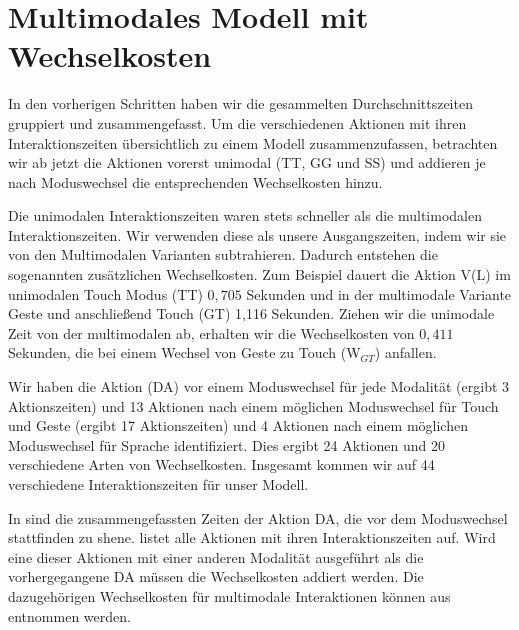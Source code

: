 \section[Multimodales Modell]{Multimodales Modell mit Wechselkosten}
In den vorherigen Schritten haben wir die gesammelten Durchschnittszeiten gruppiert und zusammengefasst.
Um die verschiedenen Aktionen mit ihren Interaktionszeiten übersichtlich zu einem Modell zusammenzufassen, betrachten wir ab jetzt die Aktionen vorerst unimodal (TT, GG und SS) und addieren je nach Moduswechsel die entsprechenden Wechselkosten hinzu.

Die unimodalen Interaktionszeiten waren stets schneller als die multimodalen Interaktionszeiten.
Wir verwenden diese als unsere Ausgangszeiten, indem wir sie von den Multimodalen Varianten subtrahieren.
Dadurch entstehen die sogenannten zusätzlichen Wechselkosten.
Zum Beispiel dauert die Aktion V(L) im unimodalen Touch Modus (TT) $0,705$ Sekunden und in der multimodale Variante Geste und anschließend Touch (GT) 1,116 Sekunden.
Ziehen wir die unimodale Zeit von der multimodalen ab, erhalten wir die Wechselkosten von $0,411$ Sekunden, die bei einem Wechsel von Geste zu Touch (W$_{GT}$) anfallen.

Wir haben die Aktion (DA) vor einem Moduswechsel für jede Modalität (ergibt 3 Aktionszeiten) und 13 Aktionen nach einem möglichen Moduswechsel für Touch und Geste (ergibt 17 Aktionszeiten) und 4 Aktionen nach einem möglichen Moduswechsel für Sprache identifiziert.
Dies ergibt 24 Aktionen und 20 verschiedene Arten von Wechselkosten.
Insgesamt kommen wir auf 44 verschiedene Interaktionszeiten für unser Modell.

In  sind die zusammengefassten Zeiten der Aktion DA, die vor dem Moduswechsel stattfinden zu shene.
 listet alle Aktionen mit ihren Interaktionszeiten auf.
Wird eine dieser Aktionen mit einer anderen Modalität ausgeführt als die vorhergegangene DA müssen die Wechselkosten addiert werden.
Die dazugehörigen Wechselkosten für multimodale Interaktionen können aus  entnommen werden.

